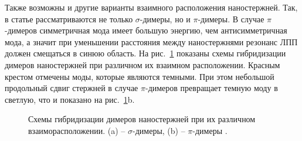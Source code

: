 Также возможны и другие варианты взаимного расположения наностержней. Так, в статье \cite{nanorods1} рассматриваются не только $ \sigma$-димеры, но и $ \pi$-димеры. В случае $ \pi$-димеров симметричная мода имеет большую энергию, чем антисимметричная мода, а значит при уменьшении расстояния между наностержнями резонанс ЛПП должен смещаться в синюю область. На рис.~\ref{img:dimer_resonances} показаны схемы гибридизации димеров наностержней при различном их взаимном расположении. Красным крестом отмечены моды, которые являются темными. При этом небольшой продольный сдвиг стержней в случае $ \pi$-димеров превращает темную моду в светлую, что и показано на рис.~\ref{img:dimer_resonances}b.

\begin{figure}[t]
\caption{Схемы гибридизации димеров наностержней при их различном взаиморасположении. (a) -- $ \sigma$-димеры, (b) -- $ \pi $-димеры \cite{nanorods1}.}
\label{img:dimer_resonances}
\end{figure}


